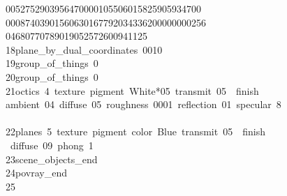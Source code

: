 \begin{tabbing}
0052752903956470000105506015825905934700\\[0pt]
00087403901560630167792034336200000000256\\[0pt]
\>04680770789019052572600941125\ \\[0pt]
18\>\>\>plane\_by\_dual\_coordinates\ 0010\ \\[0pt]
19\>\>\>group\_of\_things\ 0\ \\[0pt]
20\>\>\>group\_of\_things\ 0\ \\[0pt]
21\>\>\>octics\ 4\ texture\ pigment\ White*05\ transmit\ 05\ \ finish\ \\[0pt]
\>ambient\ 04\ diffuse\ 05\ roughness\ 0001\ reflection\ 01\ specular\ 8\\[0pt]
\>\ \ \\[0pt]
22\>\>\>planes\ 5\ texture\ pigment\ color\ Blue\ transmit\ 05\ \ finish\ \\[0pt]
\>\ diffuse\ 09\ phong\ 1\ \\[0pt]
23\>\>scene\_objects\_end\ \\[0pt]
24\>\>povray\_end\\[0pt]
25\>\end{tabbing}

